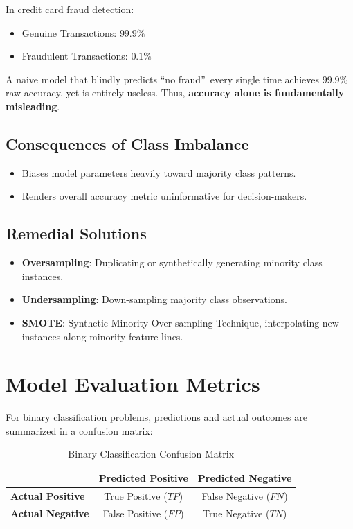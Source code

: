 \begin{remarkbox}
In credit card fraud detection:
\begin{itemize}[leftmargin=1.5em]
    \item Genuine Transactions: $99.9\%$
    \item Fraudulent Transactions: $0.1\%$
\end{itemize}
A naive model that blindly predicts \textquotedblleft no fraud\textquotedblright\ every single time achieves $99.9\%$ raw accuracy, yet is entirely useless. Thus, \textbf{accuracy alone is fundamentally misleading}.
\end{remarkbox}

\subsection{Consequences of Class Imbalance}
\begin{itemize}[leftmargin=1.5em]
    \item Biases model parameters heavily toward majority class patterns.
    \item Renders overall accuracy metric uninformative for decision-makers.
\end{itemize}

\subsection{Remedial Solutions}
\begin{itemize}[leftmargin=1.5em]
    \item \textbf{Oversampling}: Duplicating or synthetically generating minority class instances.
    \item \textbf{Undersampling}: Down-sampling majority class observations.
    \item \textbf{SMOTE}: Synthetic Minority Over-sampling Technique, interpolating new instances along minority feature lines.
\end{itemize}

\section{Model Evaluation Metrics}

For binary classification problems, predictions and actual outcomes are summarized in a confusion matrix:

\begin{table}[htbp]
\centering
\caption{Binary Classification Confusion Matrix}
\vspace{0.2em}
\begin{tabular}{lcc}
\toprule
& \textbf{Predicted Positive} & \textbf{Predicted Negative} \\
\midrule
\textbf{Actual Positive} & True Positive ($TP$) & False Negative ($FN$) \\
\addlinespace[0.3em]
\textbf{Actual Negative} & False Positive ($FP$) & True Negative ($TN$) \\
\bottomrule
\end{tabular}
\end{table}

